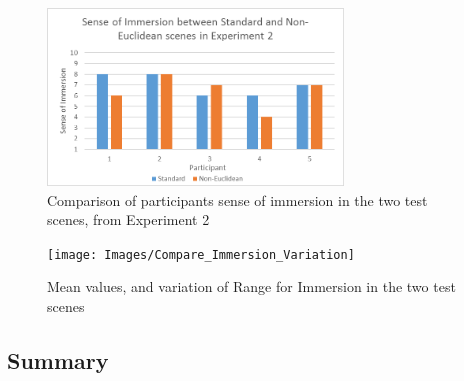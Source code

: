 			\begin{figure}
				\label{exp:fig:compare_immersion_exp2}
				\includegraphics[width=0.7\textwidth]{Images/Compare_Immersion_Exp_2}
				\centering
				\caption{Comparison of participants sense of immersion in the two test scenes, from Experiment 2}
			\end{figure}

			\begin{figure}
				\label{exp:fig:compare_immersion_variation}
				\texttt{[image: Images/Compare\_Immersion\_Variation]}
				\centering
				\caption{Mean values, and variation of Range for Immersion in the two test scenes}
			\end{figure}
			\begin{multicols*}{2}

	\section{Summary}
	\label{exp:summary}


\end{multicols*}
